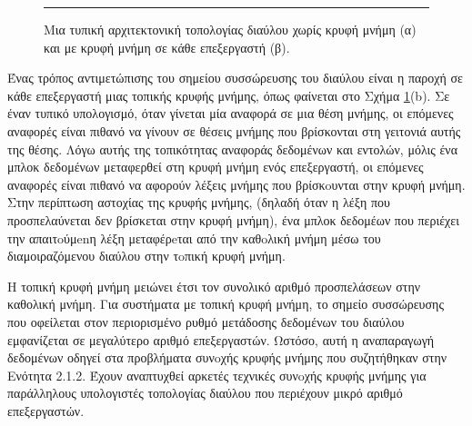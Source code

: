 \documentclass[12pt,a4paper]{article}
\begin{document}
\begin{figure}[H]
\noindent\rule{\textwidth}{0.2pt}
\caption{Μια τυπική αρχιτεκτονική τοπολογίας διαύλου
χωρίς κρυφή μνήμη (α) και με κρυφή μνήμη
σε κάθε επεξεργαστή (β).}
\label{fig:graph34}
\end{figure}
\vspace{0.3cm}

Ένας τρόπος αντιμετώπισης του σημείου συσσώρευσης του διαύλου είναι η
παροχή σε κάθε επεξεργαστή μιας τοπικής κρυφής μνήμης, όπως 
φαίνεται στο Σχήμα \ref{fig:graph34}(b). Σε έναν τυπικό υπολογισμό, όταν 
γίνεται μία αναφορά σε μια θέση μνήμης, οι επόμενες αναφορές είναι πιθανό 
να γίνουν σε θέσεις μνήμης που βρίσκονται στη γειτονιά αυτής της θέσης. 
Λόγω αυτής της τοπικότητας αναφοράς δεδομένων και εντολών, μόλις ένα 
μπλοκ δεδομένων μεταφερθεί στη κρυφή μνήμη ενός επεξεργαστή, 
οι επόμενες αναφορές είναι πιθανό να αφορούν λέξεις μνήμης που βρίσκoυνται 
στην κρυφή μνήμη. Στην περίπτωση αστοχίας της κρυφής μνήμης, (δηλαδή όταν η λέξη 
που προσπελαύνεται δεν βρίσκεται στην κρυφή μνήμη), ένα μπλοκ δεδομέων που περιέχει 
την απαιτoύμenη λέξη μεταφέρeται από την καθoλική μνήμη μέσω του 
διαμοιραζόμενου διαύλου στην τoπική κρυφή μνήμη.

Η τοπική κρυφή μνήμη μειώνει έτσι τον συνολικό αριθμό προσπελάσεων στην 
καθολική μνήμη. Για συστήματα με τοπική κρυφή μνήμη, το σημείο συσσώρευσης 
που οφείλεται στον περιορισμένο ρυθμό μετάδοσης δεδομένων του διαύλου 
εμφανίζεται σε μεγαλύτερο αριθμό επεξεργαστών. Ωστόσο, αυτή η αναπαραγωγή 
δεδομένων οδηγεί στα προβλήματα συνoχής κρυφής μνήμης που συζητήθηκαν στην Ενότητα 2.1.2. 
Έχουν αναπτυχθεί αρκετές τεχνικές συνoχής κρυφής μνήμης για παράλληλους υπολογιστές 
τοπολογίας διαύλου που περιέχουν μικρό αριθμό επεξεργαστών.
\end{document}
